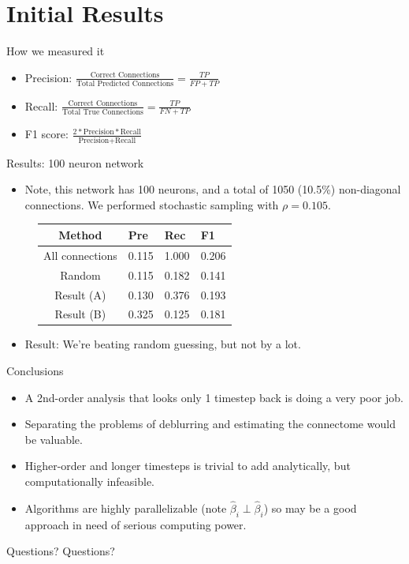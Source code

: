 \documentclass{beamer}
\begin{document}
\section{Initial Results}

\begin{frame}{How we measured it}
\begin{itemize}
	\item Precision: $\frac{\text{Correct Connections} }{ \text{Total Predicted Connections} } = \frac{ TP }{ FP + TP }$
	\item Recall: $\frac{ \text{Correct Connections} }{ \text{Total True Connections} } = \frac{ TP }{ FN + TP }$
	\item F1 score: $\frac{ 2 * \text{Precision} * \text{Recall} }{ \text{Precision} + \text{Recall} }$
\end{itemize}
\end{frame}

\begin{frame}{Results: 100 neuron network}
\begin{itemize}
\item Note, this network has 100 neurons, and a total of 1050 (10.5\%) non-diagonal connections. We performed stochastic sampling with $\rho = 0.105$.
\end{itemize}

\begin{centering}
\begin{figure}
\begin{tabular}{ c l l l }
Method & Pre & Rec & F1 \\ \hline
All connections & 0.115 & 1.000 & 0.206 \\
Random & 0.115 & 0.182 & 0.141 \\
Result (A) & 0.130 & 0.376 & 0.193 \\
Result (B) & 0.325 & 0.125 & 0.181 \\
\end{tabular}
\end{figure}
\end{centering}

\begin{itemize}
\item Result: We're beating random guessing, but not by a lot.
\end{itemize}
\end{frame}

\begin{frame}{Conclusions}
\begin{itemize}
\item A 2nd-order analysis that looks only 1 timestep back is doing a very poor job.
\item Separating the problems of deblurring and estimating the connectome would be valuable.
\item Higher-order and longer timesteps is trivial to add analytically, but computationally infeasible.
\item Algorithms are highly parallelizable (note $\hat{\beta}_i \perp \hat{\beta}_i$) so may be a good approach in need of serious computing power.
\end{itemize}
\end{frame}

\begin{frame}{Questions?}
Questions?
\end{frame}
\end{document}
